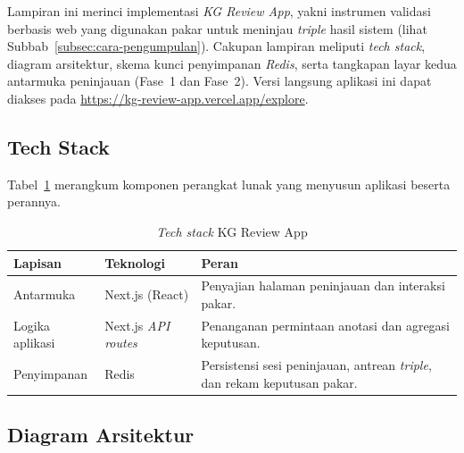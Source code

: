 \documentclass[../../thesis]{subfiles}
\begin{document}
\ifSubfilesClassLoaded{}{\appendix\setcounter{chapter}{1}}

\label{lamp:kg-review-app}

Lampiran ini merinci implementasi \textit{KG Review App}, yakni instrumen
validasi berbasis web yang digunakan pakar untuk meninjau \textit{triple}
hasil sistem (lihat Subbab~\ref{subsec:cara-pengumpulan}). Cakupan lampiran
meliputi \textit{tech stack}, diagram arsitektur, skema kunci penyimpanan
\textit{Redis}, serta tangkapan layar kedua antarmuka peninjauan (Fase~1 dan
Fase~2). Versi langsung aplikasi ini dapat diakses pada
\url{https://kg-review-app.vercel.app/explore}.

\subsection{Tech Stack}
\label{lamp:tech-stack}

Tabel~\ref{tab:tech-stack} merangkum komponen perangkat lunak yang
menyusun aplikasi beserta perannya.

\begin{table}[htbp]
  \centering
  \caption{\textit{Tech stack} KG Review App}
  \label{tab:tech-stack}
  \begin{tabularx}{\linewidth}{@{}l l X@{}}
    \toprule
    \textbf{Lapisan} & \textbf{Teknologi} & \textbf{Peran} \\
    \midrule
    Antarmuka      & Next.js (React) & Penyajian halaman peninjauan dan
                     interaksi pakar. \\
    Logika aplikasi & Next.js \textit{API routes} & Penanganan permintaan
                     anotasi dan agregasi keputusan. \\
    Penyimpanan    & Redis & Persistensi sesi peninjauan, antrean
                     \textit{triple}, dan rekam keputusan pakar. \\
    \bottomrule
  \end{tabularx}
\end{table}

\subsection{Diagram Arsitektur}
\label{lamp:diagram-arsitektur}
\end{document}
